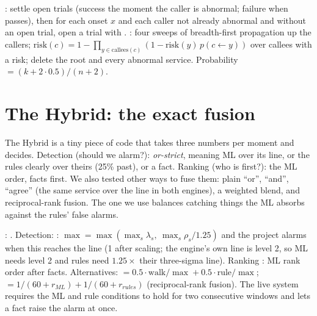 \begin{techbox}
: settle open trials (success the moment the caller is abnormal; failure when  passes), then for each onset $x$ and each caller not already abnormal and without an open trial, open a trial with . : four sweeps of breadth-first propagation up the callers; $\text{risk}(c)=1-\prod_{y\in\text{callees}(c)}(1-\text{risk}(y)\,p(c\leftarrow y))$ over callees with a risk; delete the root and every abnormal service. Probability  $=(k+2\cdot0.5)/(n+2)$.
\end{techbox}

\section{The Hybrid: the exact fusion}
\begin{simplebox}
The Hybrid is a tiny piece of code that takes three numbers per moment and decides. Detection (should we alarm?): \emph{or-strict}, meaning ML over its line, or the rules clearly over theirs (25\% past), or a fact. Ranking (who is first?): the ML order, facts first. We also tested other ways to fuse them: plain ``or'', ``and'', ``agree'' (the same service over the line in both engines), a weighted blend, and reciprocal-rank fusion. The one we use balances catching things the ML absorbs against the rules' false alarms.
\end{simplebox}

\begin{techbox}
: . Detection: : $\max=\max(\max_s\lambda_s,\ \max_s\rho_s/1.25)$ and the project alarms when this reaches the line (1 after scaling; the engine's own line is level 2, so ML needs level 2 and rules need $1.25\times$ their three-sigma line). Ranking : ML rank order after facts. Alternatives:  $=0.5\cdot\text{walk}/\max+0.5\cdot\text{rule}/\max$;  $=1/(60+r_{ML})+1/(60+r_{rules})$ (reciprocal-rank fusion). The live system requires the ML and rule conditions to hold for two consecutive windows and lets a fact raise the alarm at once.
\end{techbox}

